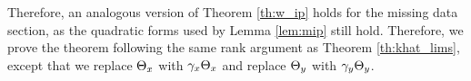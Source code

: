 Therefore, an analogous version of Theorem \ref{th:w_ip} holds for the missing data
section, as the quadratic forms used by Lemma \ref{lem:mip} still hold. Therefore, we
prove the theorem following the same rank argument as Theorem \ref{th:khat_lims}, except
that we replace $\Theta_x$ with $\gamma_x\Theta_x$ and replace $\Theta_y$ with $\gamma_y\Theta_y$.
